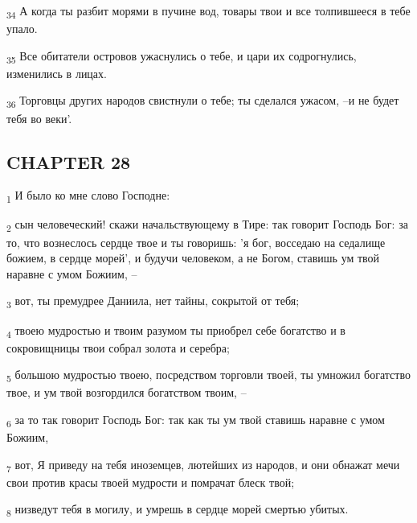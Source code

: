 \begin{tcolorbox}
\textsubscript{34} А когда ты разбит морями в пучине вод, товары твои и все толпившееся в тебе упало.
\end{tcolorbox}
\begin{tcolorbox}
\textsubscript{35} Все обитатели островов ужаснулись о тебе, и цари их содрогнулись, изменились в лицах.
\end{tcolorbox}
\begin{tcolorbox}
\textsubscript{36} Торговцы других народов свистнули о тебе; ты сделался ужасом, --и не будет тебя во веки'.
\end{tcolorbox}
\subsection{CHAPTER 28}
\begin{tcolorbox}
\textsubscript{1} И было ко мне слово Господне:
\end{tcolorbox}
\begin{tcolorbox}
\textsubscript{2} сын человеческий! скажи начальствующему в Тире: так говорит Господь Бог: за то, что вознеслось сердце твое и ты говоришь: 'я бог, восседаю на седалище божием, в сердце морей', и будучи человеком, а не Богом, ставишь ум твой наравне с умом Божиим, --
\end{tcolorbox}
\begin{tcolorbox}
\textsubscript{3} вот, ты премудрее Даниила, нет тайны, сокрытой от тебя;
\end{tcolorbox}
\begin{tcolorbox}
\textsubscript{4} твоею мудростью и твоим разумом ты приобрел себе богатство и в сокровищницы твои собрал золота и серебра;
\end{tcolorbox}
\begin{tcolorbox}
\textsubscript{5} большою мудростью твоею, посредством торговли твоей, ты умножил богатство твое, и ум твой возгордился богатством твоим, --
\end{tcolorbox}
\begin{tcolorbox}
\textsubscript{6} за то так говорит Господь Бог: так как ты ум твой ставишь наравне с умом Божиим,
\end{tcolorbox}
\begin{tcolorbox}
\textsubscript{7} вот, Я приведу на тебя иноземцев, лютейших из народов, и они обнажат мечи свои против красы твоей мудрости и помрачат блеск твой;
\end{tcolorbox}
\begin{tcolorbox}
\textsubscript{8} низведут тебя в могилу, и умрешь в сердце морей смертью убитых.
\end{tcolorbox}
